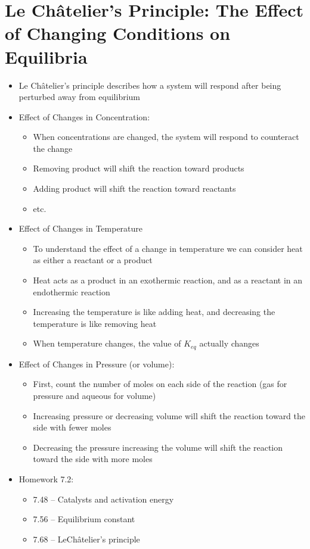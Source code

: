 \documentclass[12pt, openany, letterpaper]{memoir}
\begin{document}
\section{Le Ch\^atelier's Principle: The Effect of Changing Conditions on Equilibria}
\begin{itemize}
	\item Le Ch\^atelier's principle describes how a system will respond after being perturbed away from equilibrium
	\item Effect of Changes in Concentration:
	\begin{itemize}
		\item When concentrations are changed, the system will respond to counteract the change
		\item Removing product will shift the reaction toward products
		\item Adding product will shift the reaction toward reactants
		\item etc.
	\end{itemize}
	\item Effect of Changes in Temperature
	\begin{itemize}
		\item To understand the effect of a change in temperature we can consider heat as either a reactant or a product
		\item Heat acts as a product in an exothermic reaction, and as a reactant in an endothermic reaction
		\item Increasing the temperature is like adding heat, and decreasing the temperature is like removing heat
		\item When temperature changes, the value of $K_{eq}$ actually changes
	\end{itemize}
	\item Effect of Changes in Pressure (or volume):
	\begin{itemize}
		\item First, count the number of moles on each side of the reaction (gas for pressure and aqueous for volume)
		\item Increasing pressure or decreasing volume will shift the reaction toward the side with fewer moles
		\item Decreasing the pressure increasing the volume will shift the reaction toward the side with more moles
	\end{itemize}
	\item Homework 7.2:
	\begin{itemize}
		\item 7.48 -- Catalysts and activation energy
		\item 7.56 -- Equilibrium constant
		\item 7.68 -- LeCh\^atelier's principle
	\end{itemize}
\end{itemize}
\end{document}

